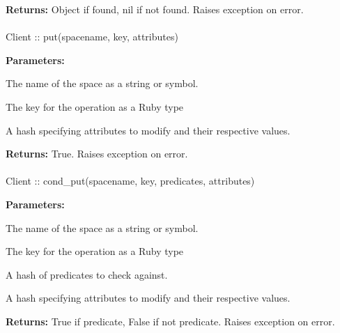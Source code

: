 \noindent\textbf{Returns:}
Object if found, nil if not found.  Raises exception on error.

\paragraph{}
\label{api:ruby:put}
\begin{rubycode}
Client :: put(spacename, key, attributes)
\end{rubycode}


\noindent\textbf{Parameters:}
\begin{description}[labelindent=\widthof{{\code{attributes}}},leftmargin=*,noitemsep,nolistsep,align=right]
\item[\code{spacename}] The name of the space as a string or symbol.
\item[\code{key}] The key for the operation as a Ruby type
\item[\code{attributes}] A hash specifying attributes to modify and their respective values.
\end{description}

\noindent\textbf{Returns:}
True.  Raises exception on error.

\paragraph{}
\label{api:ruby:cond_put}
\begin{rubycode}
Client :: cond_put(spacename, key, predicates, attributes)
\end{rubycode}


\noindent\textbf{Parameters:}
\begin{description}[labelindent=\widthof{{\code{predicates}}},leftmargin=*,noitemsep,nolistsep,align=right]
\item[\code{spacename}] The name of the space as a string or symbol.
\item[\code{key}] The key for the operation as a Ruby type
\item[\code{predicates}] A hash of predicates to check against.
\item[\code{attributes}] A hash specifying attributes to modify and their respective values.
\end{description}

\noindent\textbf{Returns:}
True if predicate, False if not predicate.  Raises exception on error.

